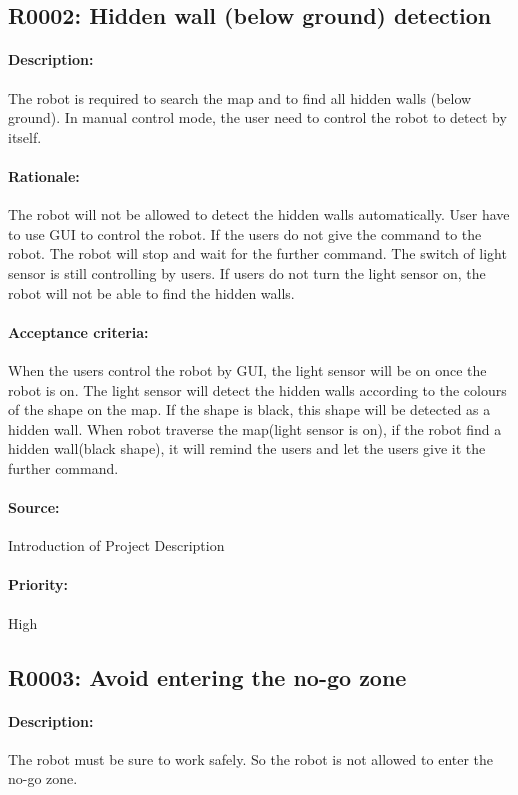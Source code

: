\documentclass[11pt, a4paper]{report}
\begin{document}
\subsection{R0002: Hidden wall (below ground) detection}
\paragraph{Description: }
The robot is required to search the map and to find all hidden walls (below ground). In manual control mode, the user need to control the robot to detect by itself.
\paragraph{Rationale: }
The robot will not be allowed to detect the hidden walls automatically. User have to use GUI to control the robot. If the users do not give the command  to the robot. The robot will stop and wait for the further command. The switch of light sensor is still controlling by users. If users do not turn the light sensor on, the robot will not be able to find the hidden walls.  
\paragraph{Acceptance criteria: }
When the users control the robot by GUI, the light sensor will be on once the robot is on. The light sensor will detect the hidden walls according to the colours of the shape on the map. If the shape is black, this shape will be detected as a hidden wall. When robot traverse the map(light sensor is on), if the robot find a hidden wall(black shape), it will remind the users and let the users give it the further command.
\paragraph{Source: }
 Introduction of Project Description
\paragraph{Priority: }
High



\subsection{R0003: Avoid entering the no-go zone}
\paragraph{Description:}
The robot must be sure to work safely. So the robot is not allowed to enter the no-go zone.
\end{document}
